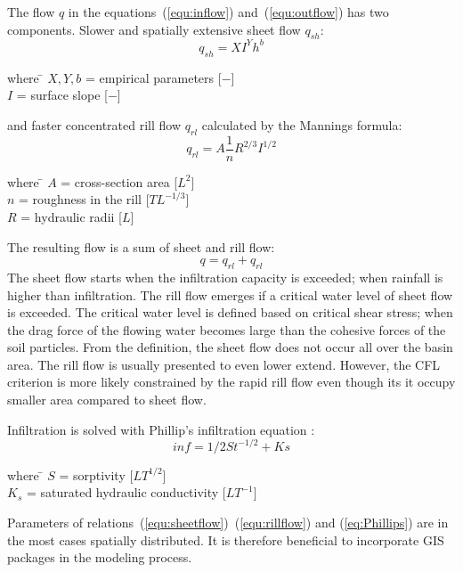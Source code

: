 The flow $q$ in the equations~(\ref{equ:inflow}) and~(\ref{equ:outflow})
has two components. Slower and spatially extensive sheet flow
$q_{sh}$:
\begin{equation}\label{equ:sheetflow}
    q_{sh} = XI^Yh^b
\end{equation}
\begin{tabbing} 
where \hspace{0.6cm} \= $X,Y,b$ = empirical parameters [$-$]\\
\> $I$ = surface slope [$-$]
\end{tabbing}
and faster concentrated rill flow $q_{rl}$ calculated by the Mannings formula:
\begin{equation}\label{equ:rillflow}
    q_{rl} = A\frac{1}{n} R^{2/3} I^{1/2}
\end{equation}
\begin{tabbing} 
where \hspace{0.6cm} \= $A$ = cross-section area [$L^2$]\\
\> $n$ = roughness in the rill [$TL^{-1/3}$]\\
\> $R$ = hydraulic radii [$L$]
\end{tabbing}
The resulting flow is a sum of sheet and rill flow:
\begin{equation}\label{equ:flow}
    q = q_{rl} + q_{rl}
\end{equation}
The sheet flow starts when the infiltration capacity is exceeded; 
when rainfall is higher than infiltration. The rill flow emerges if 
a critical water level of sheet flow is exceeded. The critical 
water level is defined based on critical shear stress; when the 
drag force of the flowing water becomes large than the cohesive 
forces of the soil particles.
From the definition, the sheet flow does not occur all over the 
basin area. The rill flow is usually presented to even lower extend. 
However, the CFL criterion is more likely constrained by the 
rapid rill flow even though its it occupy smaller area compared to sheet flow. 

Infiltration is solved with Phillip's infiltration equation \cite{philip1957theory}:
\begin{equation}\label{eq:Phillips}
    inf = 1/2St^{-1/2} + Ks
\end{equation}
\begin{tabbing} 
where \hspace{0.6cm} \= $S$ = sorptivity [$LT^{1/2}$]\\
\> $K_s$ = saturated hydraulic conductivity [$LT^{-1}$]
\end{tabbing}

Parameters of relations~(\ref{equ:sheetflow})~(\ref{equ:rillflow}) and
(\ref{eq:Phillips}) are in the most cases spatially distributed. It is 
therefore beneficial to incorporate GIS packages in the modeling process. 



